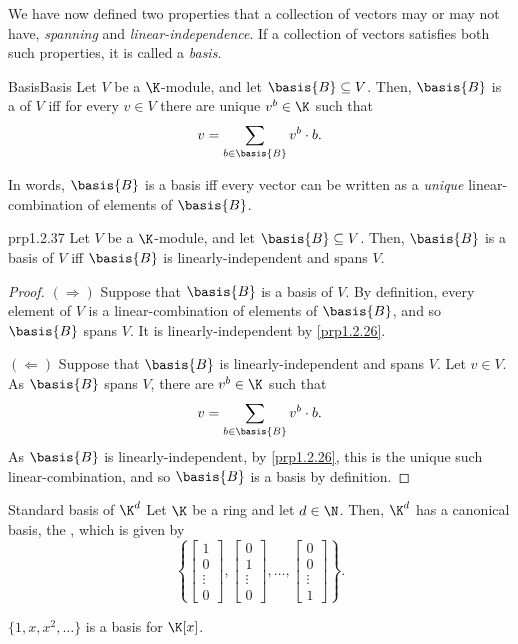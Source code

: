 We have now defined two properties that a collection of vectors may or may not have, \emph{spanning} and \emph{linear-independence}.  If a collection of vectors satisfies both such properties, it is called a \emph{basis}.
\begin{dfn}{Basis}{Basis}
	Let $V$ be a $\K$-module, and let $\basis{B}\subseteq V$.  Then, $\basis{B}$ is a  of $V$ iff for every $v\in V$ there are unique $v^b\in \K$ such that
	\begin{equation}
		v=\sum _{b\in \basis{B}}v^b\cdot b.
	\end{equation}
	\begin{rmk}
		In words, $\basis{B}$ is a basis iff every vector can be written as a \emph{unique} linear-combination of elements of $\basis{B}$.
	\end{rmk}
\end{dfn}
\begin{prp}{}{prp1.2.37}
	Let $V$ be a $\K$-module, and let $\basis{B}\subseteq V$.  Then, $\basis{B}$ is a basis of $V$ iff $\basis{B}$ is linearly-independent and spans $V$.
	\begin{proof}
		$(\Rightarrow )$ Suppose that $\basis{B}$ is a basis of $V$.  By definition, every element of $V$ is a linear-combination of elements of $\basis{B}$, and so $\basis{B}$ spans $V$.  It is linearly-independent by \cref{prp1.2.26}.
		
		\blni
		$(\Leftarrow )$ Suppose that $\basis{B}$ is linearly-independent and spans $V$.  Let $v\in V$.  As $\basis{B}$ spans $V$, there are $v^b\in \K$ such that
		\begin{equation}
			v=\sum _{b\in \basis{B}}v^b\cdot b.
		\end{equation}
		As $\basis{B}$ is linearly-independent, by \cref{prp1.2.26}, this is the unique such linear-combination, and so $\basis{B}$ is a basis by definition.
	\end{proof}
\end{prp}
\begin{exm}{Standard basis of $\K ^d$}{}
	Let $\K$ be a ring and let $d\in \N$.  Then, $\K ^d$ has a canonical basis, the , which is given by
	\begin{equation}
		\left\{ \begin{bmatrix}1 \\ 0 \\ \vdots \\ 0\end{bmatrix},\begin{bmatrix}0 \\ 1 \\ \vdots \\ 0\end{bmatrix},\ldots ,\begin{bmatrix}0 \\ 0 \\ \vdots \\ 1\end{bmatrix}\right\} .
	\end{equation}
\end{exm}
\begin{exm}{}{}
	$\{ 1,x,x^2,\ldots \}$ is a basis for $\K [x]$.
\end{exm}


